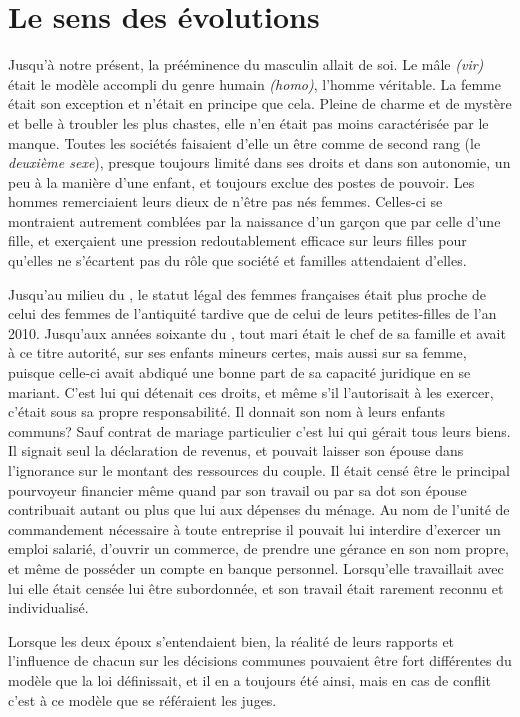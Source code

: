  
\section{Le sens des évolutions}

 Jusqu'à notre présent, la prééminence du masculin allait de soi. Le mâle \emph{(vir)} était le modèle accompli du genre humain \emph{(homo)}, l'homme véritable. La femme était son exception et n'était en principe que cela. Pleine de charme et de mystère et belle à troubler les plus chastes, elle n'en était pas moins caractérisée par le manque. Toutes les sociétés faisaient d'elle un être comme de second rang (le {\emph{deuxième sexe}}), presque toujours limité dans ses droits et dans son autonomie, un peu à la manière d'une enfant, et toujours exclue des postes de pouvoir. Les hommes remerciaient leurs dieux de n'être pas nés femmes. Celles-ci se montraient autrement comblées par la naissance d'un garçon que par celle d'une fille, et exerçaient une pression redoutablement efficace sur leurs filles pour qu'elles ne s'écartent pas du rôle que société et familles attendaient d'elles.

 Jusqu'au milieu du , le statut légal des femmes françaises était plus proche de celui des femmes de l'antiquité tardive que de celui de leurs petites-filles de l'an 2010. Jusqu'aux années soixante du , tout mari était le chef de sa famille et avait à ce titre autorité, sur ses enfants mineurs certes, mais aussi sur sa femme, puisque celle-ci avait abdiqué une bonne part de sa capacité juridique en se mariant. C'est lui qui détenait ces droits, et même s'il l'autorisait à les exercer, c'était sous sa propre responsabilité. Il donnait son nom à leurs enfants communs? Sauf contrat de mariage particulier c'est lui qui gérait tous leurs biens. Il signait seul la déclaration de revenus, et pouvait laisser son épouse dans l'ignorance sur le montant des ressources du couple. Il était censé être le principal pourvoyeur financier même quand par son travail ou par sa dot son épouse contribuait autant ou plus que lui aux dépenses du ménage. Au nom de l'unité de commandement nécessaire à toute entreprise il pouvait lui interdire d'exercer un emploi salarié, d'ouvrir un commerce, de prendre une gérance en son nom propre, et même de posséder un compte en banque personnel. Lorsqu'elle travaillait avec lui elle était censée lui être subordonnée, et son travail était rarement reconnu et individualisé. 

 Lorsque les deux époux s'entendaient bien, la réalité de leurs rapports et l'influence de chacun sur les décisions communes pouvaient être fort différentes du modèle que la loi définissait, et il en a toujours été ainsi, mais en cas de conflit c'est à ce modèle que se référaient les juges.

